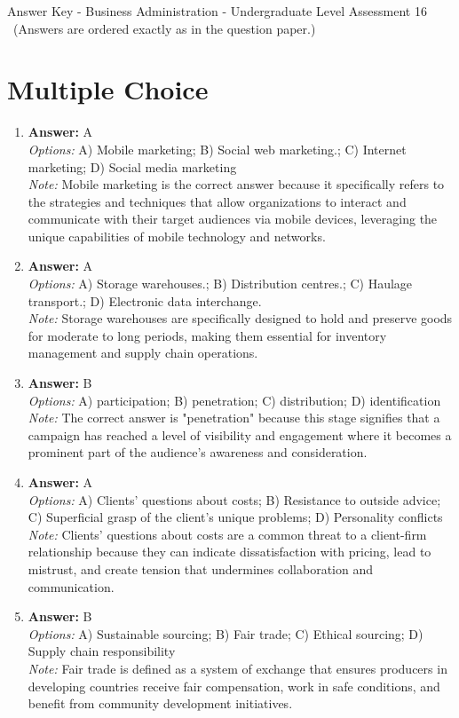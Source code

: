 \documentclass[12pt]{article}
\begin{document}
\begin{center}
Answer Key - Business Administration - Undergraduate Level Assessment 16 \
\small (Answers are ordered exactly as in the question paper.)
\end{center}

\section*{Multiple Choice}
\begin{enumerate}[label=\arabic*.]
\item \textbf{Answer:} A
\\ \textit{Options:} A) Mobile marketing; B) Social web marketing.; C) Internet marketing; D) Social media marketing
\\ \textit{Note:} Mobile marketing is the correct answer because it specifically refers to the strategies and techniques that allow organizations to interact and communicate with their target audiences via mobile devices, leveraging the unique capabilities of mobile technology and networks.
\item \textbf{Answer:} A
\\ \textit{Options:} A) Storage warehouses.; B) Distribution centres.; C) Haulage transport.; D) Electronic data interchange.
\\ \textit{Note:} Storage warehouses are specifically designed to hold and preserve goods for moderate to long periods, making them essential for inventory management and supply chain operations.
\item \textbf{Answer:} B
\\ \textit{Options:} A) participation; B) penetration; C) distribution; D) identification
\\ \textit{Note:} The correct answer is "penetration" because this stage signifies that a campaign has reached a level of visibility and engagement where it becomes a prominent part of the audience's awareness and consideration.
\item \textbf{Answer:} A
\\ \textit{Options:} A) Clients' questions about costs; B) Resistance to outside advice; C) Superficial grasp of the client's unique problems; D) Personality conflicts
\\ \textit{Note:} Clients' questions about costs are a common threat to a client-firm relationship because they can indicate dissatisfaction with pricing, lead to mistrust, and create tension that undermines collaboration and communication.
\item \textbf{Answer:} B
\\ \textit{Options:} A) Sustainable sourcing; B) Fair trade; C) Ethical sourcing; D) Supply chain responsibility
\\ \textit{Note:} Fair trade is defined as a system of exchange that ensures producers in developing countries receive fair compensation, work in safe conditions, and benefit from community development initiatives.
\end{enumerate}
\end{document}
